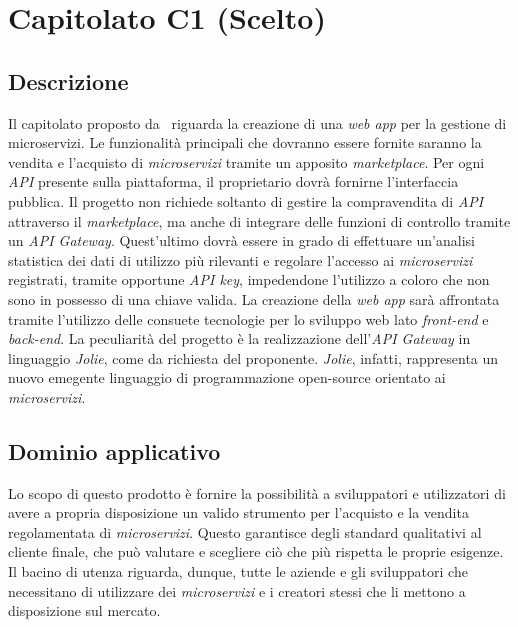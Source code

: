 \newpage
\section{Capitolato C1 (Scelto)}

\subsection{Descrizione}

Il capitolato proposto da \proponente\ riguarda la creazione di una \textit{web app} per la gestione di microservizi. Le funzionalità principali che dovranno essere fornite saranno la vendita e l'acquisto di \textit{microservizi} tramite un apposito \textit{marketplace}. Per ogni \textit{API} presente sulla piattaforma, il proprietario dovrà fornirne l'interfaccia pubblica. Il progetto non richiede soltanto di gestire la compravendita di \textit{API} attraverso il \textit{marketplace}, ma anche di integrare delle funzioni di controllo tramite un \textit{API Gateway}. Quest'ultimo dovrà essere in grado di effettuare un'analisi statistica dei dati di utilizzo più rilevanti e regolare l'accesso ai \textit{microservizi} registrati, tramite opportune \textit{API key}, impedendone l'utilizzo a coloro che non sono in possesso di una chiave valida. La creazione della \textit{web app} sarà affrontata tramite l'utilizzo delle consuete tecnologie per lo sviluppo web lato \textit{front-end} e \textit{back-end}. La peculiarità del progetto è la realizzazione dell'\textit{API Gateway} in linguaggio \textit{Jolie}, come da richiesta del proponente. \textit{Jolie}, infatti, rappresenta un nuovo emegente linguaggio di programmazione open-source orientato ai \textit{microservizi}.

\subsection{Dominio applicativo}

Lo scopo di questo prodotto è fornire la possibilità a sviluppatori e utilizzatori di avere a propria disposizione un valido strumento per l'acquisto e la vendita regolamentata di \textit{microservizi}. Questo garantisce degli standard qualitativi al cliente finale, che può valutare e scegliere ciò che più rispetta le proprie esigenze. Il bacino di utenza riguarda, dunque, tutte le aziende e gli sviluppatori che necessitano di utilizzare dei \textit{microservizi} e i creatori stessi che li mettono a disposizione sul mercato.

